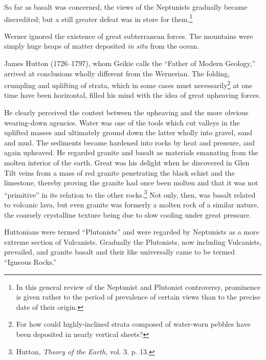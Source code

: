 \documentclass[a4paper, 12pt, oneside, landscape]{article}
\begin{document}
So far as basalt was concerned, the views of the Neptunists gradually became discredited; but a still greater defeat was in store for them.\footnote{In this general review of the Neptunist and Plutonist controversy, prominence is given rather to the period of prevalence of certain views than to the precise date of their origin.}

Werner ignored the existence of great subterranean forces. The mountains were simply huge heaps of matter deposited \emph{in situ} from the ocean.

James Hutton (1726--1797), whom Geikie calls the ``Father of Modern Geology,'' arrived at conclusions wholly different from the Wernerian. The folding, crumpling and uplifting of strata, which in some cases must necessarily\footnote{For how could highly-inclined strata composed of water-worn pebbles have been deposited in nearly vertical sheets?} at one time have been horizontal, filled his mind with the idea of great upheaving forces.

He clearly perceived the contest between the upheaving and the more obvious wearing-down agencies. Water was one of the tools which cut valleys in the uplifted masses and ultimately ground down the latter wholly into gravel, sand and mud. The sediments became hardened into rocks by heat and pressure, and again upheaved. He regarded granite and basalt as materials emanating from the molten interior of the earth. Great was his delight when he discovered in Glen Tilt veins from a mass of red granite penetrating the black schist and the limestone, thereby proving the granite had once been molten and that it was not ``primitive'' in its relation to the other rocks.\footnote{Hutton, \emph{Theory of the Earth}, vol. 3. p. 13.} Not only, then, was basalt related to volcanic lava, but even granite was formerly a molten rock of a similar nature, the coarsely crystalline texture being due to slow cooling under great pressure.

Huttonians were termed ``Plutonists'' and were regarded by Neptunists as a more extreme section of Vulcanists. Gradually the Plutonists, now including Vulcanists, prevailed, and granite basalt and their like universally came to be termed ``Igneous Rocks.''
\end{document}
